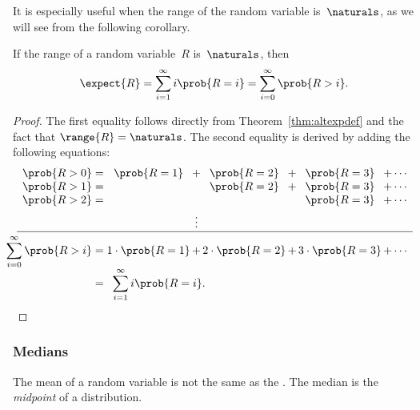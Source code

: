 \begin{editingnotes}
It is especially useful when the range of the random variable
is~$\naturals$, as we will see from the following corollary.

\begin{corollary}\label{cor:17A4}
If the range of a random variable~$R$ is~$\naturals$, then
\begin{align*}
\expect{R}
    = \sum_{i = 1}^\infty i \prob{R = i} %
    = \sum_{i = 0}^\infty \prob{R > i}. %
\end{align*}
\end{corollary}

\begin{proof}
The first equality follows directly from Theorem~\ref{thm:altexpdef}
and the fact that $\range{R} = \naturals$.  The second equality
is derived by adding the following equations:
\begin{equation*}
\begin{array}{c@{}r@{\;}c@{\;}c@{\,}c@{\,}c@{\,}c@{\,}c@{\,}c@{\,}c}
      & \prob{R > 0} &=&
            \prob{R = 1} &+& \prob{R = 2} &+& \prob{R = 3} &+& \cdots\\
      & \prob{R > 1} &=&
                         && \prob{R = 2} &+& \prob{R = 3} &+& \cdots\\
{}{} & \prob{R > 2} &=&
                         &&              && \prob{R = 3} &+&
            \cdots\\[\jot]
      & &&&\vdots \\
\hline\noalign{\vskip\jot}
      & \llap{$\displaystyle\sum_{i = 0}^\infty \prob{R > i}$} &=&
            1 \cdot \prob{R = 1} &+& 2 \cdot \prob{R = 2}
                &+& 3 \cdot \prob{R = 3} &+& \cdots\\[\jot]
      & &=& \multicolumn{7}{l}{\displaystyle\sum_{i = 1}^\infty i \prob{R = i}.}
\qedhere
\end{array}
\end{equation*}
\end{proof}

\end{editingnotes}

\subsubsection{Medians}
The mean of a random variable is not the same as the .
The median is the \emph{midpoint} of a distribution.

